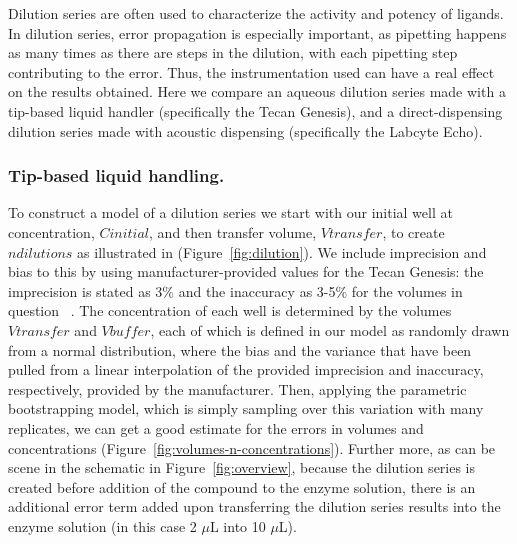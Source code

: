 \documentclass[aps,pre,twocolumn,nofootinbib,superscriptaddress,linenumbers]{revtex4-1}
\begin{document}
Dilution series are often used to characterize the activity and potency of ligands. 
In dilution series, error propagation is especially important, as pipetting happens as many times as there are steps in the dilution, with each pipetting step contributing to the error. 
Thus, the instrumentation used can have a real effect on the results obtained.
Here we compare an aqueous dilution series made with a tip-based liquid handler (specifically the Tecan Genesis), and a direct-dispensing dilution series made with acoustic dispensing (specifically the Labcyte Echo).

\subsubsection*{Tip-based liquid handling.}

To construct a model of a dilution series we start with our initial well at concentration, $Cinitial$, and then transfer volume, $Vtransfer$, to create $ndilutions$ as illustrated in (Figure~\ref{fig:dilution}). 
We include imprecision and bias to this by using manufacturer-provided values for the Tecan Genesis: the imprecision is stated as 3\% and the inaccuracy as 3-5\% for the volumes in question ~\cite{_tecan_2001}. 
The concentration of each well is determined by the volumes $Vtransfer$ and $Vbuffer$, each of which is defined in our model as randomly drawn from a normal distribution, where the bias and the variance that have been pulled from a linear interpolation of the provided imprecision and inaccuracy, respectively, provided by the manufacturer.
Then, applying the parametric bootstrapping model, which is simply sampling over this variation with many replicates, we can get a good estimate for the errors in volumes and concentrations (Figure~\ref{fig:volumes-n-concentrations}).
Further more, as can be scene in the schematic in Figure~\ref{fig:overview}, because the dilution series is created before addition of the compound to the enzyme solution, there is an additional error term added upon transferring the dilution series results into the enzyme solution (in this case 2 $\mu$L into 10 $\mu$L).
\end{document}
